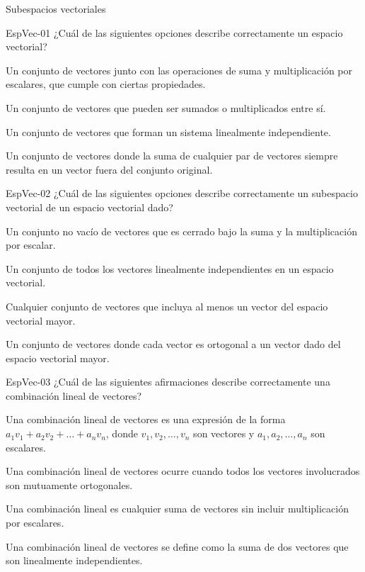 \documentclass[a4,11pt]{aleph-notas}
\begin{document}
\begin{quiz}{Subespacios vectoriales}

\begin{multi}[]%
    {EspVec-01}
    ¿Cuál de las siguientes opciones describe correctamente un espacio vectorial?
    \item* Un conjunto de vectores junto con las operaciones de suma y multiplicación por escalares, que cumple con ciertas propiedades.
    \item Un conjunto de vectores que pueden ser sumados o multiplicados entre sí.
    \item Un conjunto de vectores que forman un sistema linealmente independiente.
    \item Un conjunto de vectores donde la suma de cualquier par de vectores siempre resulta en un vector fuera del conjunto original.
\end{multi}

\begin{multi}[]%
    {EspVec-02}
    ¿Cuál de las siguientes opciones describe correctamente un subespacio vectorial de un espacio vectorial dado?
    \item* Un conjunto no vacío de vectores que es cerrado bajo la suma y la multiplicación por escalar.
    \item Un conjunto de todos los vectores linealmente independientes en un espacio vectorial.
    \item Cualquier conjunto de vectores que incluya al menos un vector del espacio vectorial mayor.
    \item Un conjunto de vectores donde cada vector es ortogonal a un vector dado del espacio vectorial mayor.
\end{multi}

\begin{multi}[]%
    {EspVec-03}
    ¿Cuál de las siguientes afirmaciones describe correctamente una combinación lineal de vectores?
    \item* Una combinación lineal de vectores es una expresión de la forma \( a_1v_1 + a_2v_2 + \ldots + a_nv_n \), donde \( v_1, v_2, \ldots, v_n \) son vectores y \( a_1, a_2, \ldots, a_n \) son escalares.
    \item Una combinación lineal de vectores ocurre cuando todos los vectores involucrados son mutuamente ortogonales.
    \item Una combinación lineal es cualquier suma de vectores sin incluir multiplicación por escalares.
    \item Una combinación lineal de vectores se define como la suma de dos vectores que son linealmente independientes.
\end{multi}


\end{quiz}
\end{document}
